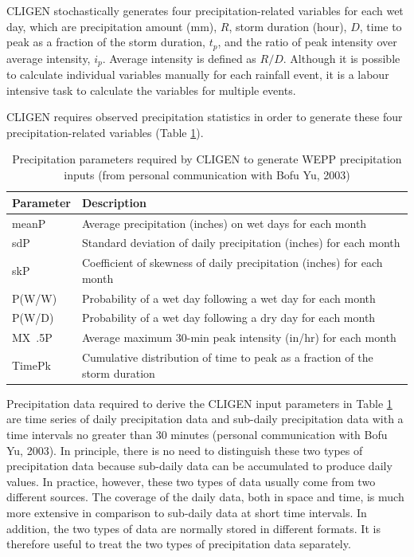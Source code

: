 CLIGEN stochastically generates four precipitation-related variables for each
wet day, which are precipitation amount  (mm), $R$, storm duration (hour), $D$,
time to peak as a fraction of the storm duration, $t_p$, and the ratio of peak
intensity over average intensity, $i_p$. Average intensity is defined as $R/D$.
Although it is possible to calculate individual variables manually for each
rainfall event, it is a labour intensive task to calculate the variables for
multiple events.

CLIGEN requires observed precipitation statistics in order to generate these
four precipitation-related variables (Table
\ref{tab:PrecipitaionParametersRequiredByCLIGEN}).

\begin{table}[htbp]
  \centering
  \caption[Precipitation parameters required by CLIGEN]{Precipitation
parameters required by CLIGEN to generate WEPP precipitation inputs (from
personal communication with Bofu Yu, 2003)}
  \label{tab:PrecipitaionParametersRequiredByCLIGEN}
  \footnotesize
    \begin{tabular}{ll}
    \toprule
    \textbf{Parameter} & \textbf{Description} \\
    \midrule
    meanP & Average precipitation (inches) on wet days for each
month\\
    sdP & Standard deviation of daily precipitation (inches) for
each month\\
    skP & Coefficient of skewness of daily precipitation (inches)
for each month\\
    P(W/W) & Probability of a wet day following a wet day for each
month\\
    P(W/D) & Probability of a wet day following a dry day for each
month\\
    MX~.5P & Average maximum 30-min peak intensity (in/hr) for each
month\\
    TimePk & Cumulative distribution of time to peak as a fraction
of the storm duration\\
    \bottomrule
    \end{tabular}
\end{table}

Precipitation data required to derive the CLIGEN input parameters in Table
\ref{tab:PrecipitaionParametersRequiredByCLIGEN} are time series of daily
precipitation data and sub-daily precipitation data with a time intervals no
greater than 30 minutes (personal communication with Bofu Yu, 2003). In
principle, there is no need to distinguish these two types of precipitation data
because sub-daily data can be accumulated to produce daily values. In practice,
however, these two types of data usually come from two different sources. The
coverage of the daily data, both in space and time, is much more extensive in
comparison to sub-daily data at short time intervals. In addition, the two types
of data are normally stored in different formats. It is therefore useful to
treat the two types of precipitation data separately.

